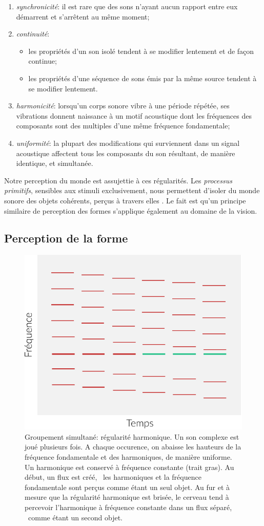\begin{enumerate}
\item \emph{synchronicité}: il est rare que des sons n'ayant aucun rapport entre eux démarrent et s'arrêtent au même moment;
\item \emph{continuité}: 
\begin{itemize}
\item les propriétés d'un son isolé tendent à se modifier lentement et de façon continue;
\item les propriétés d'une séquence de sons émis par la même source tendent à se modifier lentement.
\end{itemize}
\item \emph{harmonicité}: lorsqu'un corps sonore vibre à une période répétée, ses vibrations donnent naissance à un motif acoustique dont les fréquences des composants sont des multiples d'une même fréquence fondamentale;
\item \emph{uniformité}: la plupart des modifications qui surviennent dans un signal acoustique affectent tous les composants du son résultant, de manière identique, et simultanée.
\end{enumerate}

Notre perception du monde est assujettie à ces régularités. 
Les \emph{processus primitifs}, sensibles aux stimuli exclusivement, nous permettent d'isoler du monde sonore des objets cohérents, perçus à travers elles \citep{ballas1987interpreting}. Le fait est qu'un principe similaire de perception des formes s'applique également au domaine de la vision.

\subsection{Perception de la forme}

\begin{figure}[t]
        \myfloatalign
        \includegraphics[width=.5\linewidth]{gfx/ch_3/harmo}
        \caption[Groupement simultané: régularité harmonique.]{Groupement simultané: régularité harmonique. Un son complexe est joué plusieurs fois. A chaque occurence, on abaisse les hauteurs de la fréquence fondamentale et des harmoniques, de manière uniforme. Un harmonique est conservé à fréquence constante (trait gras). Au début, un flux est créé, \ie~les harmoniques et la fréquence fondamentale sont perçus comme étant un seul objet. Au fur et à mesure que la régularité harmonique est brisée, le cerveau tend à percevoir l'harmonique à fréquence constante dans un flux séparé, \ie~comme étant un second objet.}\label{fig:harmo}
\end{figure}

